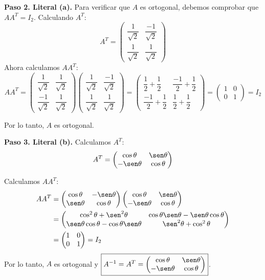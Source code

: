\begin{prob}
\begin{myproof}
\textbf{Paso 2. Literal (a).} Para verificar que $A$ es ortogonal, debemos comprobar que $AA^T = I_2$. Calculando $A^T$:
$$A^T = \begin{pmatrix} \dfrac{1}{\sqrt{2}}&\dfrac{-1}{\sqrt{2}}\\\dfrac{1}{\sqrt{2}}&\dfrac{1}{\sqrt{2}}\end{pmatrix}$$
Ahora calculamos $AA^T$:
$$AA^T = \begin{pmatrix} \dfrac{1}{\sqrt{2}}&\dfrac{1}{\sqrt{2}}\\\dfrac{-1}{\sqrt{2}}&\dfrac{1}{\sqrt{2}}\end{pmatrix} \begin{pmatrix} \dfrac{1}{\sqrt{2}}&\dfrac{-1}{\sqrt{2}}\\\dfrac{1}{\sqrt{2}}&\dfrac{1}{\sqrt{2}}\end{pmatrix}= \begin{pmatrix} \dfrac{1}{2}+\dfrac{1}{2} & \dfrac{-1}{2}+\dfrac{1}{2}\\\dfrac{-1}{2}+\dfrac{1}{2} & \dfrac{1}{2}+\dfrac{1}{2}\end{pmatrix} = \begin{pmatrix} 1 & 0\\0 & 1\end{pmatrix} = I_2$$

Por lo tanto, $A$ es ortogonal.

\textbf{Paso 3. Literal (b).} Calculamos $A^T$:
$$A^T = \begin{pmatrix} \cos\theta & \sen\theta\\-\sen\theta&\cos\theta \end{pmatrix}$$

Calculamos $AA^T$:
\begin{align*}
AA^T &= \begin{pmatrix} \cos\theta & -\sen\theta\\\sen\theta&\cos\theta \end{pmatrix} \begin{pmatrix} \cos\theta & \sen\theta\\-\sen\theta&\cos\theta \end{pmatrix}\\&= \begin{pmatrix} \cos^2\theta + \sen^2\theta & \cos\theta\sen\theta - \sen\theta\cos\theta\\\sen\theta\cos\theta - \cos\theta\sen\theta & \sen^2\theta + \cos^2\theta \end{pmatrix}\\&= \begin{pmatrix} 1 & 0\\0 & 1 \end{pmatrix} = I_2
\end{align*}
Por lo tanto, $A$ es ortogonal y $\boxed{A^{-1} = A^T = \begin{pmatrix} \cos\theta & \sen\theta\\-\sen\theta&\cos\theta \end{pmatrix}}$.


\end{myproof}
\end{prob}
